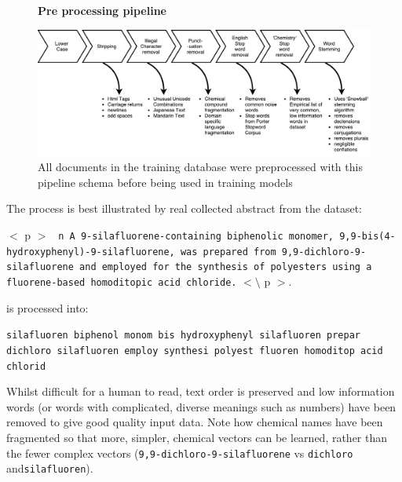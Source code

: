 \begin{figure}[H]
    \centering
    \textbf{Pre processing pipeline}\par\medskip
    \includegraphics[scale=0.2]{Algorithm/Data_Sanitation.pdf}
    \caption{All documents in the training database were preprocessed with this pipeline schema before being used in training models}
     \label{fig:SANPIPE}
\end{figure}
The process is best illustrated by real collected abstract from the dataset:

$<$ p $>$
\texttt{ n A 9-silafluorene-containing biphenolic monomer, 9,9-bis(4-hydroxyphenyl)-9-silafluorene, was prepared from 9,9-dichloro-9-silafluorene and employed for the synthesis of polyesters using a fluorene-based homoditopic acid chloride.} $< \setminus$ p $>$.
\cite{sanex} 

is processed into:

\texttt{silafluoren biphenol monom bis hydroxyphenyl silafluoren prepar dichloro silafluoren employ synthesi polyest fluoren homoditop acid chlorid}

Whilst difficult for a human to read, text order is preserved and low information words (or words with complicated, diverse meanings such as numbers) have been removed to give good quality input data. Note how chemical names have been fragmented so that more, simpler, chemical vectors can be learned, rather than the fewer complex vectors (\texttt{9,9-dichloro-9-silafluorene} vs \texttt{dichloro} and\texttt{silafluoren}).

